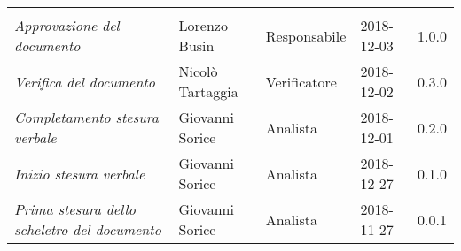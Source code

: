 \newpage 
\section*{}
\begin{table}[H]
	\centering
	\begin{tabular}{p{4cm}|C{3cm}|C{3cm}|R{2.5cm}|R{2cm}}
		
		 & & & & \\
		
		
		\emph{Approvazione del documento} & Lorenzo Busin & Responsabile & 2018-12-03 & 1.0.0 \\
		\hline
		
		\emph{Verifica del documento} & Nicolò Tartaggia & Verificatore & 2018-12-02 & 0.3.0 \\
		\hline

		\emph{Completamento stesura verbale} & Giovanni Sorice & Analista & 2018-12-01 & 0.2.0 \\
		\hline

		\emph{Inizio stesura verbale} & Giovanni Sorice & Analista & 2018-12-27 & 0.1.0 \\
		\hline
		
		\emph{Prima stesura dello scheletro del documento} & Giovanni Sorice & Analista & 2018-11-27 & 0.0.1 \\
		
	\end{tabular}
	
\end{table}


\clearpage